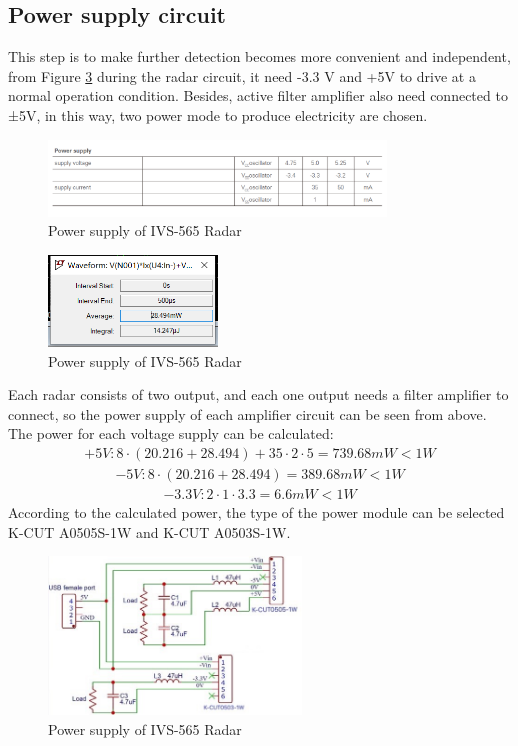 \subsection{Power supply circuit}
This step is to make further detection becomes more convenient and independent, from Figure \ref{fig:power_radar} during the radar circuit, it need -3.3 V and +5V to drive at a normal operation condition. Besides, active filter amplifier also need connected to ±5V, in this way, two power mode to produce electricity are chosen.
\begin{figure}[H]
    \centering
    \includegraphics[width=0.8\textwidth]{figure/powersupplyofIVS565Radar.png}
    \caption{Power supply of IVS-565 Radar}
    \label{fig:power_radar}
\end{figure}
\begin{figure}[H]
    \centering
    \includegraphics[width=0.4\textwidth]{figure/powerAM2.png}
    \caption{Power supply of IVS-565 Radar}
    \label{fig:power_radar}
\end{figure}
Each radar consists of two output, and each one output needs a filter amplifier to connect, so the power supply of each amplifier circuit can be seen from above.
The power for each voltage supply can be calculated:
\begin{align}
+5 V: 8\cdot(20.216+28.494)+35\cdot2\cdot5=739.68 m W<1 W
\end{align}
\begin{align}
-5 V: 8\cdot(20.216+28.494)=389.68 m W<1 W
\end{align}
\begin{align}
-3.3 V: 2\cdot1\cdot3.3=6.6 m W<1 W
\end{align}
According to the calculated power, the type of the power module can be selected K-CUT A0505S-1W and K-CUT A0503S-1W.

\begin{figure}[H]
    \centering
    \includegraphics[width=0.6\textwidth]{figure/powersupplycircuit.jpg}
    \caption{Power supply of IVS-565 Radar}
    \label{fig:power_radar}
\end{figure}

